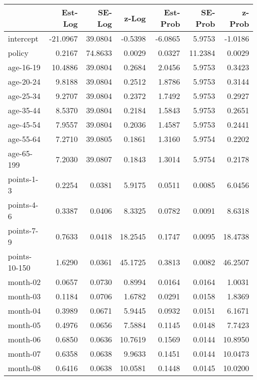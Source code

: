 \documentclass[10pt]{article}
\begin{document}

\begin{table}[ht]
\centering
\begin{tabular}{lrrrrrr}
  \hline
 & Est-Log & SE-Log & z-Log & Est-Prob & SE-Prob & z-Prob \\ 
  \hline
intercept & -21.0967 & 39.0804 & -0.5398 & -6.0865 & 5.9753 & -1.0186 \\ 
  policy & 0.2167 & 74.8633 & 0.0029 & 0.0327 & 11.2384 & 0.0029 \\ 
  age-16-19 & 10.4886 & 39.0804 & 0.2684 & 2.0456 & 5.9753 & 0.3423 \\ 
  age-20-24 & 9.8188 & 39.0804 & 0.2512 & 1.8786 & 5.9753 & 0.3144 \\ 
  age-25-34 & 9.2707 & 39.0804 & 0.2372 & 1.7492 & 5.9753 & 0.2927 \\ 
  age-35-44 & 8.5370 & 39.0804 & 0.2184 & 1.5843 & 5.9753 & 0.2651 \\ 
  age-45-54 & 7.9557 & 39.0804 & 0.2036 & 1.4587 & 5.9753 & 0.2441 \\ 
  age-55-64 & 7.2710 & 39.0805 & 0.1861 & 1.3160 & 5.9754 & 0.2202 \\ 
  age-65-199 & 7.2030 & 39.0807 & 0.1843 & 1.3014 & 5.9754 & 0.2178 \\ 
  points-1-3 & 0.2254 & 0.0381 & 5.9175 & 0.0511 & 0.0085 & 6.0456 \\ 
  points-4-6 & 0.3387 & 0.0406 & 8.3325 & 0.0782 & 0.0091 & 8.6318 \\ 
  points-7-9 & 0.7633 & 0.0418 & 18.2545 & 0.1747 & 0.0095 & 18.4738 \\ 
  points-10-150 & 1.6290 & 0.0361 & 45.1725 & 0.3813 & 0.0082 & 46.2507 \\ 
  month-02 & 0.0657 & 0.0730 & 0.8994 & 0.0164 & 0.0164 & 1.0031 \\ 
  month-03 & 0.1184 & 0.0706 & 1.6782 & 0.0291 & 0.0158 & 1.8369 \\ 
  month-04 & 0.3989 & 0.0671 & 5.9445 & 0.0932 & 0.0151 & 6.1671 \\ 
  month-05 & 0.4976 & 0.0656 & 7.5884 & 0.1145 & 0.0148 & 7.7423 \\ 
  month-06 & 0.6850 & 0.0636 & 10.7619 & 0.1569 & 0.0144 & 10.8950 \\ 
  month-07 & 0.6358 & 0.0638 & 9.9633 & 0.1451 & 0.0144 & 10.0473 \\ 
  month-08 & 0.6416 & 0.0638 & 10.0581 & 0.1448 & 0.0145 & 10.0200 \\ 

\end{tabular}
\end{table}
\end{document}
